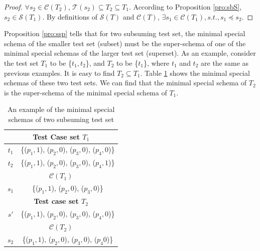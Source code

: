 \begin{proof}
$\forall s_{2} \in \mathcal{C}(T_{2})$,  $\mathcal{T}(s_{2}) \subseteq T_{2} \subseteq T_{1}$. According to Proposition \ref{pro:sbS}, $s_{2} \in \mathcal{S}(T_{1})$. By definitions of $\mathcal{S}(T)$ and $\mathcal{C}(T)$, $\exists s_{1} \in \mathcal{C}(T_{1}), s.t., s_{1} \preceq s_{2}$.
\end{proof}

Proposition \ref{pro:ssp} tells that for two subsuming test set, the minimal special schema of the smaller test set (subset) must be the super-schema of one of the minimal special schemas of the larger test set (superset). As an example, consider the test set $T_{1}$ to be \{$t_{1}, t_{2}$\}, and $T_{2}$ to be \{$t_{1}$\}, where $t_{1}$ and $t_{2}$ are the same as previous examples. It is easy to find $T_{2} \subseteq T_{1}$. Table  \ref{ex:minimalspecialschematwosubsumingtestset} shows the minimal special schemas of these two test sets. We can find that the minimal special schema of $T_{2}$ is the super-schema of the minimal special schema of $T_{1}$.

\begin{table}[htbp]
  \centering
  \caption{An example of the minimal special schemas of two subsuming test set}
      \label{ex:minimalspecialschematwosubsumingtestset}
    \begin{tabular}{|c|c|} \hline
  \multicolumn{2}{|c|}{\textbf{Test Case set $T_{1}$}} \\ \hline
  $t_{1}$ & \{($p_{1}, 1$), ($p_{2}, 0$), ($p_{3}, 0$), ($p_{4}, 0$)\}\\
  $t_{2}$ & \{($p_{1}, 1$), ($p_{2}, 0$), ($p_{3}, 0$), ($p_{4}, 1$)\}\\ \hline
  \multicolumn{2}{|c|}{\textbf{ $\mathcal{C}(T_{1})$ }}  \\ \hline
  $s_{1}$ & \{($p_{1}, 1$), ($p_{2}, 0$), ($p_{3}, 0$)\}  \\ \hline
  \multicolumn{2}{|c|}{\textbf{Test case set $T_{2}$}} \\ \hline
  $s'$ & \{($p_{1}, 1$), ($p_{2}, 0$), ($p_{3}, 0$), ($p_{4}, 0$)\}\\ \hline
  \multicolumn{2}{|c|}{\textbf{ $\mathcal{C}(T_{2})$ }}  \\ \hline
  $s_{2}$ & \{($p_{1}, 1$), ($p_{2}, 0$), ($p_{3}, 0$), ($p_{4} 0$)\} \\ \hline
    \end{tabular}%
\end{table}%



